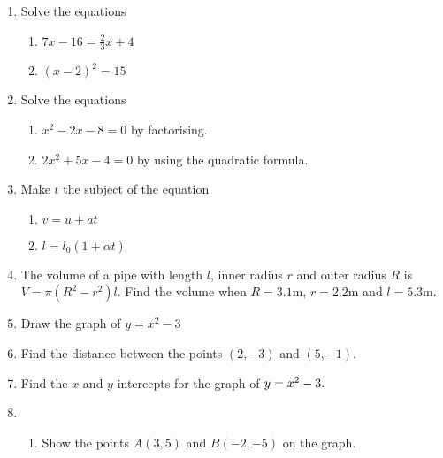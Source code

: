\begin{enumerate}
	\item Solve the equations 
	
	
	\begin{enumerate}
		\item $7 x -16 =\frac{2}{3} x +4$ 
		
		\item $\left (x -2\right )^{2} =15$ \end{enumerate}

	\item Solve the equations 
	
	
	\begin{enumerate}
		\item $x^{2} -2 x -8 =0$ by factorising. 
		
		\item $2 x^{2} +5 x -4 =0$ by using the quadratic formula. \end{enumerate}
	
	
	\item
	Make $t$ the subject of the equation 
	
	
	\begin{enumerate}
		\item $v =u +a t$ 
		
		\item $l =l_{0} \left (1 +\alpha  t\right )$ \end{enumerate}
	
	
	\item 
	The volume of a pipe with length $l$, inner radius $r$ and outer radius $R$ is $V =\pi  \left (R^{2} -r^{2}\right ) l\text{.}$ Find the volume when $R =3.1 \mbox{m}$, $r =2.2 \mbox{m}$ and $l =5.3 \mbox{m}\text{.}$ 
	
	\item  Draw the graph of $y =x^{2} -3$ 
	
	\item  Find the distance between the points $\left (2 , -3\right )$ and $\left (5 , -1\right )\text{.}$ 
	
	\item  Find the $x$ and $y$ intercepts for the graph of $y =x^{2} -3.\vspace{+5.000000cm}$ 
	
	\item    
	\setlength\fboxrule{0in}\setlength\fboxsep{0.2in}
	\begin{enumerate}
		\item Show the points $A \left (3 ,5\right )$ and $B \left ( -2 , -5\right )$ on the graph. 
		

\end{enumerate}
\end{enumerate}
